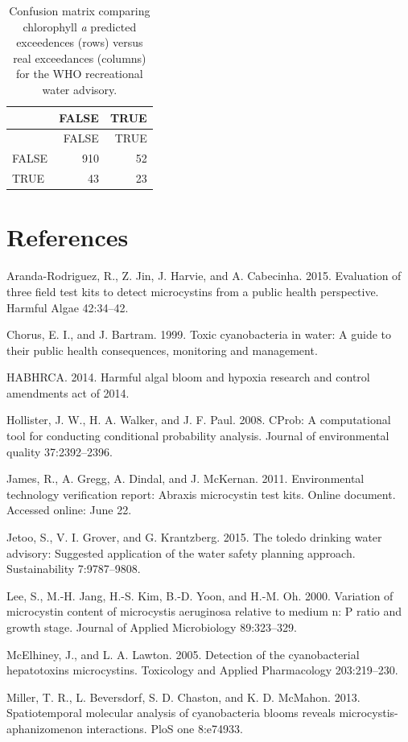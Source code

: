 \documentclass[11pt,]{article}
\begin{document}
\newpage

\begin{longtable}[c]{@{}lrr@{}}
\caption{Confusion matrix comparing chlorophyll \textit{a} predicted
exceedences (rows) versus real exceedances (columns) for the WHO
recreational water advisory.
\label{tab:who_rec_conmat_table}}\tabularnewline
\toprule
& FALSE & TRUE\tabularnewline
\midrule
\endfirsthead
\toprule
& FALSE & TRUE\tabularnewline
\midrule
\endhead
FALSE & 910 & 52\tabularnewline
TRUE & 43 & 23\tabularnewline
\bottomrule
\end{longtable}

\newpage

\section*{References}\label{references}

Aranda-Rodriguez, R., Z. Jin, J. Harvie, and A. Cabecinha. 2015.
Evaluation of three field test kits to detect microcystins from a public
health perspective. Harmful Algae 42:34--42.

Chorus, E. I., and J. Bartram. 1999. Toxic cyanobacteria in water: A
guide to their public health consequences, monitoring and management.

HABHRCA. 2014. Harmful algal bloom and hypoxia research and control
amendments act of 2014.

Hollister, J. W., H. A. Walker, and J. F. Paul. 2008. CProb: A
computational tool for conducting conditional probability analysis.
Journal of environmental quality 37:2392--2396.

James, R., A. Gregg, A. Dindal, and J. McKernan. 2011. Environmental
technology verification report: Abraxis microcystin test kits. Online
document. Accessed online: June 22.

Jetoo, S., V. I. Grover, and G. Krantzberg. 2015. The toledo drinking
water advisory: Suggested application of the water safety planning
approach. Sustainability 7:9787--9808.

Lee, S., M.-H. Jang, H.-S. Kim, B.-D. Yoon, and H.-M. Oh. 2000.
Variation of microcystin content of microcystis aeruginosa relative to
medium n: P ratio and growth stage. Journal of Applied Microbiology
89:323--329.

McElhiney, J., and L. A. Lawton. 2005. Detection of the cyanobacterial
hepatotoxins microcystins. Toxicology and Applied Pharmacology
203:219--230.

Miller, T. R., L. Beversdorf, S. D. Chaston, and K. D. McMahon. 2013.
Spatiotemporal molecular analysis of cyanobacteria blooms reveals
microcystis-aphanizomenon interactions. PloS one 8:e74933.
\end{document}
